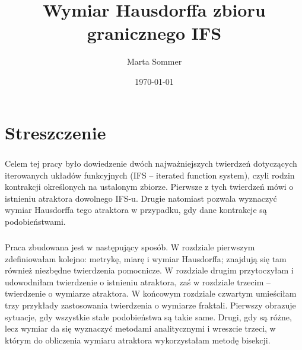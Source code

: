\documentclass{mini}
\title{Wymiar Hausdorffa zbioru granicznego IFS}
\author{Marta Sommer}
\date{\today}
\begin{document}
\maketitle
\tableofcontents

\newtheorem{tw}{Twierdzenie}[chapter]

\newtheorem{tws}{Twierdzenie}[section]

\newenvironment{dow1}{\textbf{\textit{Dowód pierwszy}}}{\begin{flushright} $\blacksquare$ \end{flushright}} 

\newenvironment{dow2}{\textbf{\textit{Dowód drugi}}}{\begin{flushright} $\blacksquare$ \end{flushright}}

\newtheorem{df}{Definicja}[chapter]

\newtheorem{lem}{Lemat}[chapter]

\newenvironment{dow}{\textbf{\textit{Dowód}}}{\begin{flushright} $\blacksquare$ \end{flushright}}


\chapter*{Streszczenie}

\begin{doublespace}
\paragraph{}
Celem tej pracy było dowiedzenie dwóch najważniejszych twierdzeń dotyczących iterowanych układów funkcyjnych (IFS – iterated function system), czyli rodzin kontrakcji określonych na ustalonym zbiorze. Pierwsze z tych twierdzeń mówi o istnieniu atraktora dowolnego IFS-u. Drugie natomiast pozwala wyznaczyć wymiar Hausdorffa tego atraktora w przypadku, gdy dane kontrakcje są podobieństwami. 
\paragraph{} 
Praca zbudowana jest w następujący sposób. W rozdziale pierwszym zdefiniowałam kolejno: metrykę, miarę i wymiar Hausdorffa; znajdują się tam również niezbędne twierdzenia pomocnicze. W rozdziale drugim przytoczyłam i udowodniłam twierdzenie o istnieniu atraktora, zaś w rozdziale trzecim – twierdzenie o wymiarze atraktora. W końcowym rozdziale czwartym umieściłam trzy przykłady zastosowania twierdzenia o wymiarze fraktali. Pierwszy obrazuje sytuacje, gdy wszystkie stałe podobieństwa są takie same. Drugi, gdy są różne, lecz wymiar da się wyznaczyć metodami analitycznymi i wreszcie trzeci, w którym do obliczenia wymiaru atraktora wykorzystałam metodę bisekcji.
\end{doublespace}
\end{document}
